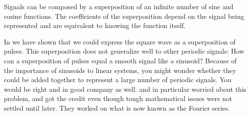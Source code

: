 \documentclass[letterpaper]{cnx}
\begin{document}
\begin{cnxmodule}[name=Fourier Series,id=m0039]
\begin{metadata}[version=2.19,created=2000/07/21,revised=2004/08/17 22:07:27.213 GMT-5]
\begin{authorlist}
  \cnxauthor[id=dhj,firstname=Don,surname=Johnson,email=dhj@rice.edu]
\end{authorlist}
\begin{maintainerlist}
  \maintainer[id=rha,firstname=Roy,surname=Ha,email=rha@rice.edu]
  \maintainer[id=dhj,firstname=Don,surname=Johnson,email=dhj@rice.edu]
  \maintainer[id=bfite,firstname=Benjamin,surname=Fite,email=bfite@rice.edu]
\end{maintainerlist}
\begin{keywordlist}
\end{keywordlist}
\begin{cnxabstract}
  Signals can be composed by a superposition of an infinite number
 of sine and cosine functions.  The coefficients of the superposition
 depend on the signal being represented and are equivalent to knowing
 the function itself.
\end{cnxabstract}
\end{metadata}


\begin{ccontent}
\begin{cpara}[id=p01]
      In 
      we have shown that we could express the square wave as a superposition
      of pulses. This superposition does not generalize well to other periodic signals:
      How can a superposition of pulses equal a smooth signal like a sinusoid?  Because of
      the importance of sinusoids to linear systems, you might wonder whether they could
      be added together to represent a large number of periodic signals. You would be
      right and in good company as well.
      and 
      in particular worried about this problem, and 
      got the credit even though tough mathematical issues were not settled until
      later. They worked on what is now known as the Fourier series.
    \end{cpara}
    

\end{ccontent}
\end{cnxmodule}
\end{document}
